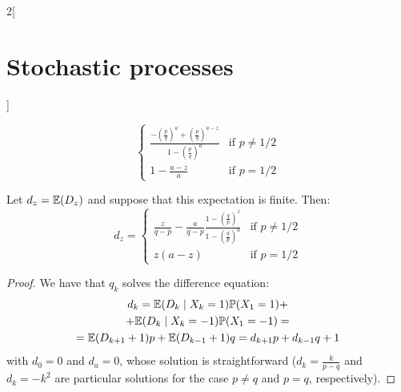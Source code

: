 \documentclass[../../../main_math.tex]{subfiles}
\begin{document}
\begin{multicols}{2}[\section{Stochastic processes}]
\begin{sproof}
$$\begin{cases}
        \frac{-{\left(\frac{p}{q}\right)}^a+{\left(\frac{p}{q}\right)}^{a-z}}{1-{\left(\frac{p}{q}\right)}^a} & \text{if $p\ne 1/2$} \\
        1-\frac{a-z}{a}                                                                                       & \text{if $p= 1/2$}
      \end{cases}$$
  \end{sproof}
  \begin{proposition}
    Let $d_z=\mathbb{E}(D_z)$ and suppose that this expectation is finite. Then:
    $$
      d_z=\begin{cases}
        \frac{z}{q-p}-\frac{a}{q-p}\frac{1-{\left(\frac{q}{p}\right)}^z}{1-{\left(\frac{q}{p}\right)}^a} & \text{if $p\ne 1/2$} \\
        z(a-z)                                                                                           & \text{if $p= 1/2$}
      \end{cases}
    $$
  \end{proposition}
  \begin{proof}
    We have that $q_k$ solves the difference equation:
    \begin{multline*}
      d_k =\mathbb{E}(D_k\mid X_k=1)\mathbb{P}(X_1=1)+\\
      +\mathbb{E}(D_k\mid X_k=-1)\mathbb{P}(X_1=-1) =\\=\mathbb{E}(D_{k+1}+1)p+\mathbb{E}(D_{k-1}+1)q= d_{k+1}p+d_{k-1}q+1
    \end{multline*}
    with $d_0=0$ and $d_a=0$, whose solution is straightforward ($d_k=\frac{k}{p-q}$ and $d_k=-k^2$ are particular solutions for the case $p\ne q$ and $p=q$, respectively).
  \end{proof}

\end{multicols}
\end{document}
